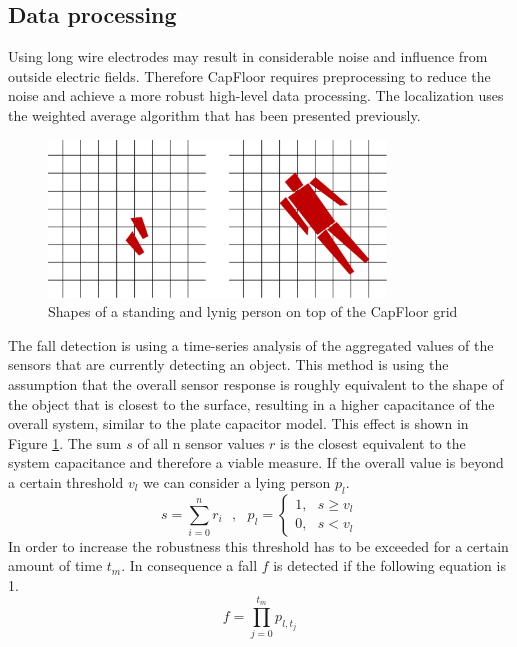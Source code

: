 \subsection{Data processing}
Using long wire electrodes may result in considerable noise and influence from outside electric fields. Therefore CapFloor requires preprocessing to reduce the noise and achieve a more robust high-level data processing. The localization uses the weighted average algorithm that has been presented previously. 
\begin{figure}[h]
\centering
\includegraphics[width=0.8\textwidth]{images/floor_shapes}
\caption{Shapes of a standing and lynig person on top of the CapFloor grid}
\label{fig:capfloor_shapes}
\end{figure}
The fall detection is using a time-series analysis of the aggregated values of the sensors that are currently detecting an object. This method is using the assumption that the overall sensor response is roughly equivalent to the shape of the object that is closest to the surface, resulting in a higher capacitance of the overall system, similar to the plate capacitor model. This effect is shown in Figure \ref{fig:capfloor_shapes}. The sum $s$ of all n sensor values $r$ is the closest equivalent to the system capacitance and therefore a viable measure. If the overall value is beyond a certain threshold $v_l$ we can consider a lying person $p_l$.
\begin{equation}
s=\sum^n_{i=0}{r_i}\ \ \ ,\ \ \ p_l=\left\{ \begin{array}{c}
1,\ \ \ s\ge v_l \\ 
0,\ \ \ s<v_l \end{array}
\right.
\end{equation}
In order to increase the robustness this threshold has to be exceeded for a certain amount of time $t_m$. In consequence a fall $f$ is detected if the following equation is 1.
\begin{equation}
f=\prod^{t_m}_{j=0}{p_{l,t_j}}
\end{equation}
